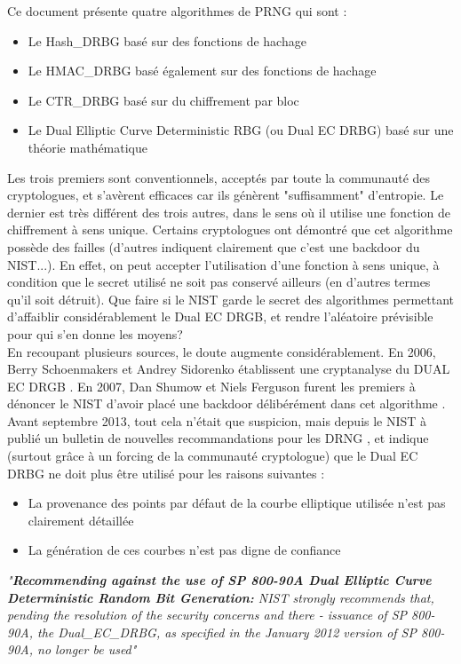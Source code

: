 	Ce document présente quatre algorithmes de PRNG qui sont :
	\begin{itemize}
		\item Le Hash\_DRBG basé sur des fonctions de hachage
		\item Le HMAC\_DRBG basé également sur des fonctions de hachage
		\item Le CTR\_DRBG basé sur du chiffrement par bloc
		\item Le Dual Elliptic Curve Deterministic RBG (ou Dual EC DRBG) basé sur une théorie mathématique\\
	\end{itemize}

	Les trois premiers sont conventionnels, acceptés par toute la communauté des cryptologues, et s'avèrent efficaces car ils génèrent "suffisamment" d'entropie. 	Le dernier est très différent des trois autres, dans le sens où il utilise une fonction de chiffrement à sens unique. Certains cryptologues ont démontré que cet algorithme possède des failles (d'autres indiquent clairement que c'est une backdoor du NIST...). En effet, on peut accepter l'utilisation d'une fonction à sens unique, à condition que le secret utilisé ne soit pas conservé ailleurs (en d'autres termes qu'il soit détruit). 	Que faire si le NIST garde le secret des algorithmes permettant d'affaiblir considérablement le Dual EC DRGB, et rendre l'aléatoire prévisible pour qui s'en donne les moyens?\\

	En recoupant plusieurs sources, le doute augmente considérablement.	En 2006, Berry Schoenmakers et Andrey Sidorenko établissent une cryptanalyse du DUAL EC DRGB \cite{dualecrbg2006berry}.	 En 2007, Dan Shumow et Niels Ferguson furent les premiers à dénoncer le NIST d'avoir placé une backdoor délibérément dans cet algorithme \cite{shumow2007nist}.\\
	
	Avant septembre 2013, tout cela n'était que suspicion, mais depuis le NIST à publié un bulletin de nouvelles recommandations pour les DRNG \cite{newRecomendingNist}, et indique (surtout grâce à un forcing de la communauté cryptologue) que le Dual EC DRBG ne doit plus être utilisé pour les raisons suivantes :
	\begin{itemize}
		\item La provenance des points par défaut de la courbe elliptique utilisée n'est pas clairement détaillée
		\item La génération de ces courbes n'est pas digne de confiance\\
	\end{itemize}
	\textit{"\textbf{Recommending against the use of SP 800-90A Dual Elliptic Curve Deterministic Random Bit Generation:} NIST strongly recommends that, pending the resolution of the security concerns and there - issuance of SP 800-90A, the Dual\_EC\_DRBG, as specified in the January 2012 version of SP 800-90A, no longer be used"}\\

